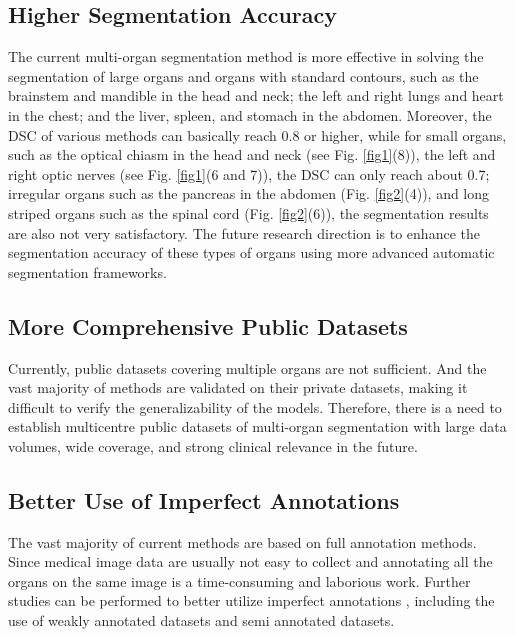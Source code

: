 \documentclass[lettersize,journal]{IEEEtran}
\begin{document}
\subsection{Higher Segmentation Accuracy}
\label{sec6_1}
The current multi-organ segmentation method is more effective in solving the segmentation of large organs and organs with standard contours, such as the brainstem and mandible in the head and neck; the left and right lungs and heart in the chest; and the liver, spleen, and stomach in the abdomen. Moreover, the DSC of various methods can basically reach 0.8 or higher, while for small organs, such as the optical chiasm in the head and neck (see Fig. \ref{fig1}(8)), the left and right optic nerves (see Fig. \ref{fig1}(6 and 7)), the DSC can only reach about 0.7; irregular organs such as the pancreas in the abdomen (Fig. \ref{fig2}(4)), and long striped organs such as the spinal cord (Fig. \ref{fig2}(6)), the segmentation results are also not very satisfactory. The future research direction is to enhance the segmentation accuracy of these types of organs using more advanced automatic segmentation frameworks.

\subsection{More Comprehensive Public Datasets}
\label{sec6_2}
Currently, public datasets covering multiple organs are not sufficient. And the vast majority of methods are validated on their private datasets, making it difficult to verify the generalizability of the models. Therefore, there is a need to establish multicentre public datasets of multi-organ segmentation with large data volumes, wide coverage, and strong clinical relevance in the future.

\subsection{Better Use of Imperfect Annotations}
\label{sec6_3}
The vast majority of current methods are based on full annotation methods. Since medical image data are usually not easy to collect and annotating all the organs on the same image is a time-consuming and laborious work. Further studies can be performed to better utilize imperfect annotations \cite{213,214}, including the use of weakly annotated datasets and semi annotated datasets.
\end{document}
